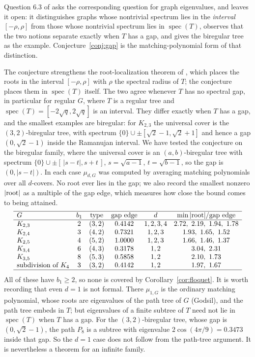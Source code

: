 \documentclass[11pt]{article}
\theoremstyle{remark}
\begin{document}
Question 6.3 of \cite{HPS} asks the corresponding question for graph
eigenvalues, and leaves it open: it distinguishes graphs whose nontrivial
spectrum lies in the \emph{interval} $[-\rho,\rho]$ from those whose nontrivial
spectrum lies in $\operatorname{spec}(T)$, observes that the two notions
separate exactly when $T$ has a gap, and gives the biregular tree as the
example. Conjecture~\ref{conj:gap} is the matching-polynomial form of that
distinction.

The conjecture strengthens the root-localization theorem of \cite{HPS}, which
places the roots in the interval $[-\rho,\rho]$ with $\rho$ the spectral radius
of $T$;
the conjecture places them in $\operatorname{spec}(T)$ itself. The two agree
whenever $T$ has no spectral gap, in particular for regular $G$, where $T$
is a regular tree and $\operatorname{spec}(T)=[-2\sqrt{q},2\sqrt{q}]$ is an
interval. They differ exactly when $T$ has a gap, and the smallest examples are
biregular: for $K_{2,3}$ the universal cover is the $(3,2)$-biregular tree,
with spectrum $\{0\}\cup\pm[\sqrt2-1,\sqrt2+1]$ and hence a gap
$(0,\sqrt2-1)$ inside the Ramanujan interval. We have tested the conjecture on the
biregular family, where the universal cover is an $(a,b)$-biregular tree with
spectrum $\{0\}\cup\pm[\,|s-t|,s+t\,]$, $s=\sqrt{a-1}$, $t=\sqrt{b-1}$, so the
gap is $(0,|s-t|)$. In each case $\mu_{d,G}$ was computed by averaging matching
polynomials over all $d$-covers. No root ever lies in the gap; we also record
the smallest nonzero $|{\rm root}|$ as a multiple of the gap edge, which
measures how close the bound comes to being attained.
\[
\begin{array}{lccccc}
\hline
G & b_1 & \text{type} & \text{gap edge} & d & \min|{\rm root}|/\text{gap edge}\\
\hline
K_{2,3} & 2 & (3,2) & 0.4142 & 1,2,3,4 & 2.72,\ 2.19,\ 1.94,\ 1.78\\
K_{2,4} & 3 & (4,2) & 0.7321 & 1,2,3 & 1.93,\ 1.65,\ 1.52\\
K_{2,5} & 4 & (5,2) & 1.0000 & 1,2,3 & 1.66,\ 1.46,\ 1.37\\
K_{3,4} & 6 & (4,3) & 0.3178 & 1,2 & 3.04,\ 2.31\\
K_{3,5} & 8 & (5,3) & 0.5858 & 1,2 & 2.10,\ 1.73\\
\text{subdivision of }K_4 & 3 & (3,2) & 0.4142 & 1,2 & 1.97,\ 1.67\\
\hline
\end{array}
\]
All of these have $b_1\ge2$, so none is covered by
Corollary~\ref{cor:floquet}. It is worth recording that even $d=1$ is not
formal. There $\mu_{1,G}$ is the ordinary matching polynomial, whose roots are
eigenvalues of the path tree of $G$ (Godsil), and the path tree embeds in $T$;
but eigenvalues of a finite subtree of $T$ need not lie in
$\operatorname{spec}(T)$ when $T$ has a gap. For the $(3,2)$-biregular tree,
whose gap is $(0,\sqrt2-1)$, the path $P_8$ is a subtree with eigenvalue
$2\cos(4\pi/9)=0.3473$ inside that gap. So the $d=1$ case does not follow from
the path-tree argument. It is nevertheless a theorem for an infinite family.
\end{document}
